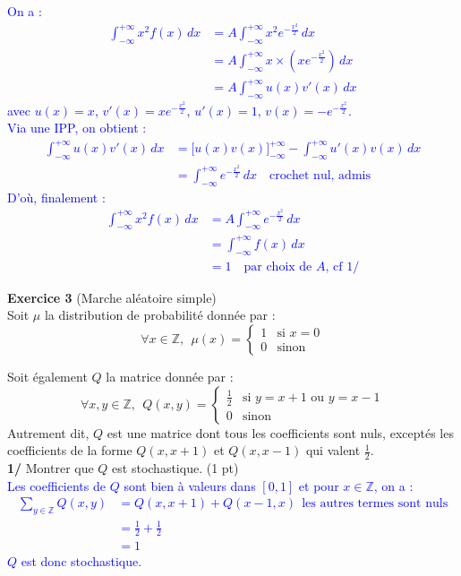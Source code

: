 \documentclass[a4paper,12pt]{article}
\begin{document}
\textcolor{blue}{
On a :
\begin{align*}
\int_{-\infty}^{+\infty} x^2 f(x) \, dx &= A \int_{-\infty}^{+\infty} x^2 e^{-\frac{x^2}{2}} \, dx \\
&= A \int_{-\infty}^{+\infty} x \times \left( x e^{-\frac{x^2}{2}} \right) \, dx \\
&= A \int_{-\infty}^{+\infty} u(x) v'(x) \, dx
\end{align*}
avec \( u(x) = x \), \( v'(x) = x e^{-\frac{x^2}{2}} \), \( u'(x) = 1 \), \( v(x) = -e^{-\frac{x^2}{2}} \). \\
Via une IPP, on obtient :
\begin{align*}
\int_{-\infty}^{+\infty} u(x)v'(x) \, dx &= \big[u(x)v(x)\big]_{-\infty}^{+\infty} - \int_{-\infty}^{+\infty} u'(x) v(x) \, dx \\
&= \int_{-\infty}^{+\infty} e^{-\frac{x^2}{2}} \, dx \quad \text{crochet nul, admis}
\end{align*}
D'où, finalement :
\begin{align*}
\int_{-\infty}^{+\infty} x^2 f(x) \, dx &= A \int_{-\infty}^{+\infty} e^{-\frac{x^2}{2}} \, dx \\
&= \int_{-\infty}^{+\infty} f(x) \, dx \\
& \boxed{= 1} \quad \text{par choix de }A\text{, cf 1/}
\end{align*}
}

\textbf{Exercice 3} (Marche aléatoire simple) \\
Soit $\mu$ la distribution de probabilité donnée par :
$$
\forall x \in \mathbb{Z}, \ \ \mu(x) =
\begin{cases} 
1 & \text{si } x=0  \\
0 & \text{sinon}
\end{cases}
$$

Soit également $Q$ la matrice donnée par :
$$
\forall x,y \in \mathbb{Z}, \ \ Q(x, y) =
\begin{cases} 
\frac{1}{2} & \text{si } y = x + 1 \text{ ou } y = x - 1 \\
0 & \text{sinon}
\end{cases}
$$
Autrement dit, $Q$ est une matrice dont tous les coefficients sont nuls, exceptés les coefficients de la forme $Q(x,x+1)$ et $Q(x,x-1)$ qui valent $\frac{1}{2}$. \\

\textbf{1/} Montrer que $Q$ est stochastique. (1 pt) \\

\textcolor{blue}{
Les coefficients de $Q$ sont bien à valeurs dans $[0,1]$ et pour $x \in \mathbb{Z}$, on a :
\begin{align*}
\sum_{y \in \mathbb{Z}} Q(x,y) &= Q(x,x+1)+Q(x-1,x) \ \ \text{les autres termes sont nuls} \\
&= \frac{1}{2}+\frac{1}{2} \\
&= 1 
\end{align*}
$Q$ est donc stochastique.
} \\
\end{document}
